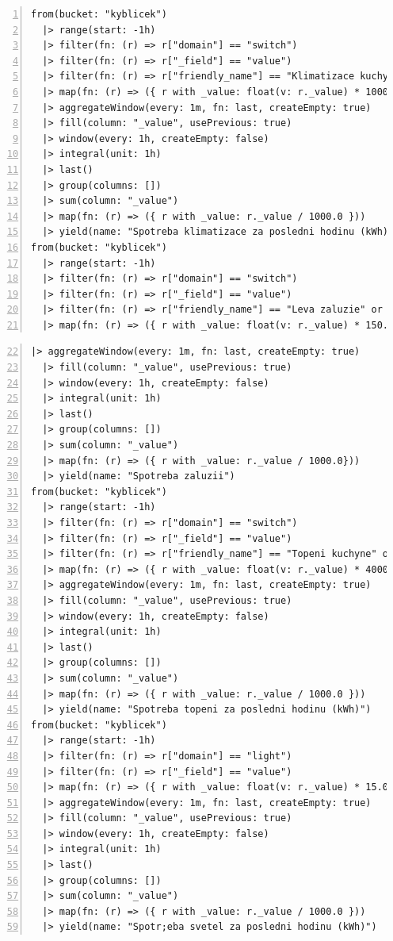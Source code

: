 \begin{lstlisting}[language=flux, breaklines=true, numbers=left, numberstyle=\small, numbersep=10pt, frame=single, basicstyle=\ttfamily\small, caption={Grafana - Rozložení spotřeby}, label={lst:grafanaSpotreba}]
  from(bucket: "kyblicek")
  |> range(start: -1h)
  |> filter(fn: (r) => r["domain"] == "switch")
  |> filter(fn: (r) => r["_field"] == "value")
  |> filter(fn: (r) => r["friendly_name"] == "Klimatizace kuchyne" or r["friendly_name"] == "Klimatizace pracovna" or r["friendly_name"] == "Klimatizace u televize")
  |> map(fn: (r) => ({ r with _value: float(v: r._value) * 1000.0 }))
  |> aggregateWindow(every: 1m, fn: last, createEmpty: true)
  |> fill(column: "_value", usePrevious: true)
  |> window(every: 1h, createEmpty: false)
  |> integral(unit: 1h)
  |> last()
  |> group(columns: [])
  |> sum(column: "_value")
  |> map(fn: (r) => ({ r with _value: r._value / 1000.0 }))
  |> yield(name: "Spotreba klimatizace za posledni hodinu (kWh)")
from(bucket: "kyblicek")
  |> range(start: -1h)
  |> filter(fn: (r) => r["domain"] == "switch")
  |> filter(fn: (r) => r["_field"] == "value")
  |> filter(fn: (r) => r["friendly_name"] == "Leva zaluzie" or r["friendly_name"] == "Prava zaluzie")
  |> map(fn: (r) => ({ r with _value: float(v: r._value) * 150.0 }))
\end{lstlisting}
\pagebreak
\begin{lstlisting}[language=flux, breaklines=true, numbers=left, firstnumber=22, numberstyle=\small, numbersep=10pt, frame=single, basicstyle=\ttfamily\small]
  |> aggregateWindow(every: 1m, fn: last, createEmpty: true)
  |> fill(column: "_value", usePrevious: true)
  |> window(every: 1h, createEmpty: false)
  |> integral(unit: 1h)
  |> last()
  |> group(columns: [])
  |> sum(column: "_value")
  |> map(fn: (r) => ({ r with _value: r._value / 1000.0}))
  |> yield(name: "Spotreba zaluzii")
from(bucket: "kyblicek")
  |> range(start: -1h)
  |> filter(fn: (r) => r["domain"] == "switch")
  |> filter(fn: (r) => r["_field"] == "value")
  |> filter(fn: (r) => r["friendly_name"] == "Topeni kuchyne" or r["friendly_name"] == "Topeni pracovna" or r["friendly_name"] == "Topeni u televize")
  |> map(fn: (r) => ({ r with _value: float(v: r._value) * 4000.0 }))
  |> aggregateWindow(every: 1m, fn: last, createEmpty: true)
  |> fill(column: "_value", usePrevious: true)
  |> window(every: 1h, createEmpty: false)
  |> integral(unit: 1h)
  |> last()
  |> group(columns: [])
  |> sum(column: "_value")
  |> map(fn: (r) => ({ r with _value: r._value / 1000.0 }))
  |> yield(name: "Spotreba topeni za posledni hodinu (kWh)")
from(bucket: "kyblicek")
  |> range(start: -1h)
  |> filter(fn: (r) => r["domain"] == "light")
  |> filter(fn: (r) => r["_field"] == "value")
  |> map(fn: (r) => ({ r with _value: float(v: r._value) * 15.0 }))
  |> aggregateWindow(every: 1m, fn: last, createEmpty: true)
  |> fill(column: "_value", usePrevious: true)
  |> window(every: 1h, createEmpty: false)
  |> integral(unit: 1h)
  |> last()
  |> group(columns: [])
  |> sum(column: "_value")
  |> map(fn: (r) => ({ r with _value: r._value / 1000.0 }))
  |> yield(name: "Spotr;eba svetel za posledni hodinu (kWh)")
\end{lstlisting}
\pagebreak
